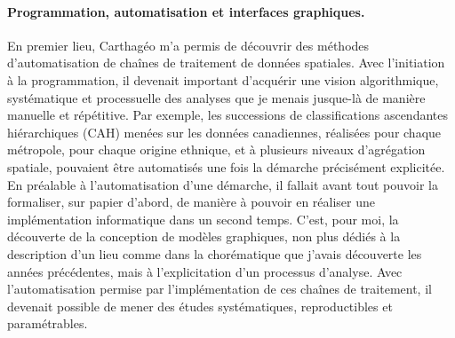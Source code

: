\paragraph{Programmation, automatisation et interfaces graphiques.}

En premier lieu, Carthagéo m'a permis de découvrir des méthodes d'automatisation de chaînes de traitement de données spatiales.
Avec l'initiation à la programmation, il devenait important d'acquérir une vision algorithmique, systématique et processuelle des analyses que je menais jusque-là de manière manuelle et répétitive.
Par exemple, les successions de classifications ascendantes hiérarchiques (CAH) menées sur les données canadiennes, réalisées pour chaque métropole, pour chaque origine ethnique, et à plusieurs niveaux d'agrégation spatiale, pouvaient être automatisés une fois la démarche précisément explicitée.
En préalable à l'automatisation d'une démarche, il fallait avant tout pouvoir la formaliser, sur papier d'abord, de manière à pouvoir en réaliser une implémentation informatique dans un second temps.
C'est, pour moi, la découverte de la conception de modèles graphiques, non plus dédiés à la description d'un lieu comme dans la chorématique que j'avais découverte les années précédentes, mais à l'explicitation d'un processus d'analyse.
Avec l'automatisation permise par l'implémentation de ces chaînes de traitement, il devenait possible de mener des études systématiques, reproductibles et paramétrables.


